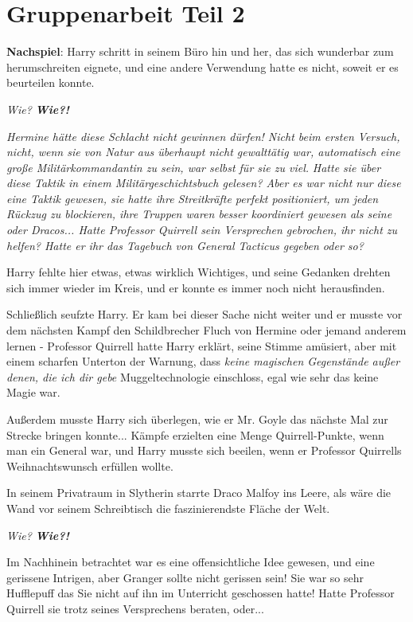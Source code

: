 \chapter{Gruppenarbeit Teil 2}

\textbf{Nachspiel}: Harry schritt in seinem Büro hin und her, das sich wunderbar
zum herumschreiten eignete, und eine andere Verwendung hatte es nicht, soweit er
es beurteilen konnte.

\emph{ Wie? }
\textbf{\emph{Wie?! }}

\emph{Hermine hätte diese Schlacht nicht gewinnen dürfen! Nicht beim ersten Versuch, nicht, wenn sie von Natur aus überhaupt nicht gewalttätig war, automatisch eine große Militärkommandantin zu sein, war selbst für sie zu viel.}
\emph{ Hatte sie über diese Taktik in einem Militärgeschichtsbuch gelesen? Aber
es war nicht nur diese eine Taktik gewesen, sie hatte ihre Streitkräfte perfekt
positioniert, um jeden Rückzug zu blockieren, ihre Truppen waren besser
koordiniert gewesen als seine oder Dracos... Hatte Professor Quirrell sein
Versprechen gebrochen, ihr nicht zu helfen? Hatte er ihr das Tagebuch von
General Tacticus gegeben oder so? }

Harry fehlte hier etwas, etwas wirklich Wichtiges, und seine Gedanken drehten
sich immer wieder im Kreis, und er konnte es immer noch nicht herausfinden.

Schließlich seufzte Harry. Er kam bei dieser Sache nicht weiter und er musste
vor dem nächsten Kampf den Schildbrecher Fluch von Hermine oder jemand anderem
lernen - Professor Quirrell hatte Harry erklärt, seine Stimme amüsiert, aber mit
einem scharfen Unterton der Warnung, dass\emph{ \glqq keine magischen
Gegenstände außer denen, die ich dir gebe\grqq{} } Muggeltechnologie einschloss,
egal wie sehr das keine Magie war.

Außerdem musste Harry sich überlegen, wie er Mr. Goyle das nächste Mal zur
Strecke bringen konnte... Kämpfe erzielten eine Menge Quirrell-Punkte, wenn man
ein General war, und Harry musste sich beeilen, wenn er Professor Quirrells
Weihnachtswunsch erfüllen wollte.


In seinem Privatraum in Slytherin starrte Draco Malfoy ins Leere, als wäre die
Wand vor seinem Schreibtisch die faszinierendste Fläche der Welt.

\emph{ Wie? }
\textbf{\emph{Wie?! }}

Im Nachhinein betrachtet war es eine offensichtliche Idee gewesen, und eine
gerissene Intrigen, aber Granger sollte nicht gerissen sein! Sie war so sehr
Hufflepuff das Sie nicht auf ihn im Unterricht geschossen hatte! Hatte Professor
Quirrell sie trotz seines Versprechens beraten, oder...

